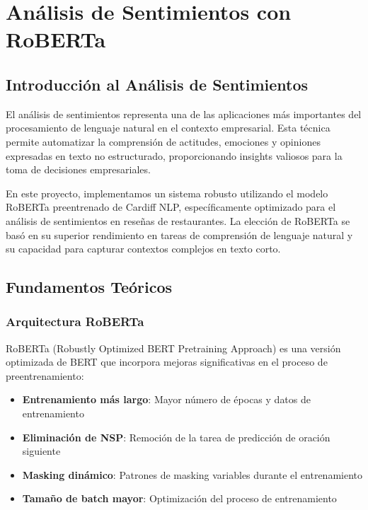 \documentclass[12pt,a4paper,twoside,openany]{book}
\begin{document}
\chapter{Análisis de Sentimientos con \mbox{RoBERTa}}

\section{Introducción al Análisis de Sentimientos}

El análisis de sentimientos representa una de las aplicaciones más importantes del procesamiento de lenguaje natural en el contexto empresarial. Esta técnica permite automatizar la comprensión de actitudes, emociones y opiniones expresadas en texto no estructurado, proporcionando insights valiosos para la toma de decisiones empresariales.

En este proyecto, implementamos un sistema robusto utilizando el modelo RoBERTa preentrenado de Cardiff NLP, específicamente optimizado para el análisis de sentimientos en reseñas de restaurantes. La elección de RoBERTa se basó en su superior rendimiento en tareas de comprensión de lenguaje natural y su capacidad para capturar contextos complejos en texto corto.

\section{Fundamentos Teóricos}

\subsection{Arquitectura RoBERTa}

RoBERTa (Robustly Optimized BERT Pretraining Approach) es una versión optimizada de BERT que incorpora mejoras significativas en el proceso de preentrenamiento:

\begin{itemize}
    \item \textbf{Entrenamiento más largo}: Mayor número de épocas y datos de entrenamiento
    \item \textbf{Eliminación de NSP}: Remoción de la tarea de predicción de oración siguiente
    \item \textbf{Masking dinámico}: Patrones de masking variables durante el entrenamiento
    \item \textbf{Tamaño de batch mayor}: Optimización del proceso de entrenamiento
\end{itemize}
\end{document}
